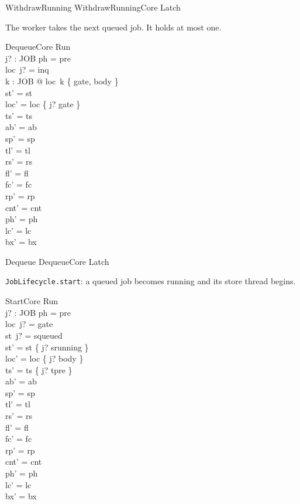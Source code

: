 \documentclass[a4paper,10pt,fleqn]{article}
\newcommand{\field}[1]{\texttt{#1}}
\begin{document}
\begin{zed}
WithdrawRunning  WithdrawRunningCore \land Latch
\end{zed}

The worker takes the next queued job. It holds at most one.

\begin{schema}{DequeueCore}
\Delta Run \\ j? : JOB
\where
ph = pre \\
loc~j? = inq \\
\forall k : JOB @ loc~k \notin \{ gate, body \} \\
st' = st \\
loc' = loc \oplus \{ j? \mapsto gate \} \\
ts' = ts \\
ab' = ab \\
sp' = sp \\
tl' = tl \\
rs' = rs \\
fl' = fl \\
fc' = fc \\
rp' = rp \\
cnt' = cnt \\
ph' = ph \\
lc' = lc \\
bx' = bx
\end{schema}

\begin{zed}
Dequeue  DequeueCore \land Latch
\end{zed}

\field{JobLifecycle.start}: a queued job becomes running and its store thread
begins.

\begin{schema}{StartCore}
\Delta Run \\ j? : JOB
\where
ph = pre \\
loc~j? = gate \\
st~j? = squeued \\
st' = st \oplus \{ j? \mapsto srunning \} \\
loc' = loc \oplus \{ j? \mapsto body \} \\
ts' = ts \oplus \{ j? \mapsto tpre \} \\
ab' = ab \\
sp' = sp \\
tl' = tl \\
rs' = rs \\
fl' = fl \\
fc' = fc \\
rp' = rp \\
cnt' = cnt \\
ph' = ph \\
lc' = lc \\
bx' = bx
\end{schema}
\end{document}

